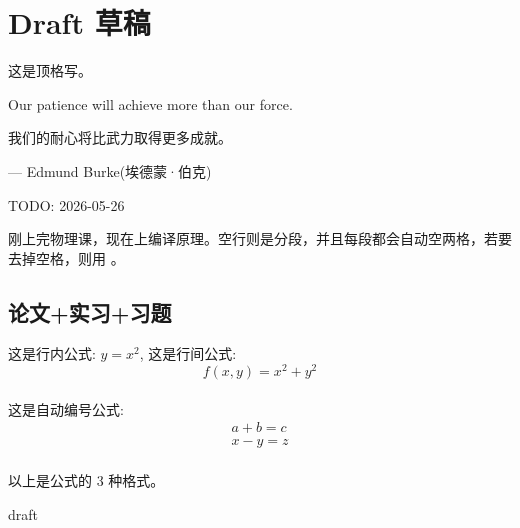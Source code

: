 \section{Draft 草稿}
\noindent 这是顶格写。

Our patience will achieve more than our force.

我们的耐心将比武力取得更多成就。\par
\hfill --- Edmund Burke(埃德蒙·伯克)\par
\hfill TODO: 2026-05-26

刚上完物理课，现在上编译原理。空行则是分段，并且每段都会自动空两格，若要去掉空格，则用 \noindent。

\subsection{论文+实习+习题}
这是行内公式: \(y = x^2\), 这是行间公式: 
\[
  f(x, y) = x^2 + y^2
\] \\ 
这是自动编号公式:
\begin{gather}
a + b = c \\
x - y = z
\end{gather} \\
以上是公式的 3 种格式。

draft

